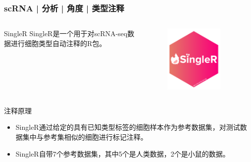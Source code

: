 \documentclass[11pt]{ctexbeamer}
\begin{document}
\begin{frame}
	\frametitle{scRNA | 分析 | 角度 | 类型注释}
	\begin{columns}
			\begin{block}{SingleR}
			SingleR是一个用于对scRNA-seq数据进行细胞类型自动注释的R包。
		\end{block}
		     \begin{figure}
			\includegraphics[width=0.8\textwidth]{scRNA_singler_logo.png}
		\end{figure}
	\end{columns}
    \begin{block}{注释原理}
    	\begin{itemize}
    		\item SingleR通过给定的具有已知类型标签的细胞样本作为参考数据集，对测试数据集中与参考集相似的细胞进行标记注释。
    		\item SingleR自带7个参考数据集，其中5个是人类数据，2个是小鼠的数据。
    	\end{itemize}
    \end{block}
\end{frame}
\end{document}
